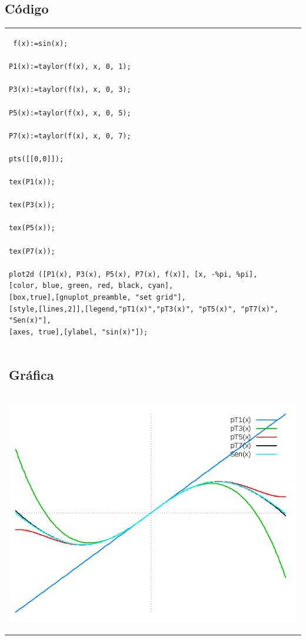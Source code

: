 \documentclass[10pt]{article}
\begin{document}
\subsection{Código}
\begin{tabular}{l}
\begin{verbatim}  
 f(x):=sin(x);

P1(x):=taylor(f(x), x, 0, 1);

P3(x):=taylor(f(x), x, 0, 3);

P5(x):=taylor(f(x), x, 0, 5);

P7(x):=taylor(f(x), x, 0, 7);

pts([[0,0]]);

tex(P1(x));

tex(P3(x));

tex(P5(x));

tex(P7(x));

plot2d ([P1(x), P3(x), P5(x), P7(x), f(x)], [x, -%pi, %pi],
[color, blue, green, red, black, cyan], 
[box,true],[gnuplot_preamble, "set grid"],
[style,[lines,2]],[legend,"pT1(x)","pT3(x)", "pT5(x)", "pT7(x)", "Sen(x)"],
[axes, true],[ylabel, "sin(x)"]);
\end{verbatim} \\
\subsection{Gráfica}\\
\begin{center}
  
    \includegraphics[scale=0.4]{sinx}
\end{center}
\end{tabular}
\end{document}
